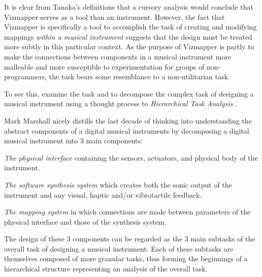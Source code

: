 It is clear from Tanaka's definitions that a cursory analysis would conclude that Vizmapper serves as a tool than an instrument. However, the fact that Vizmapper is specifically a tool to accomplish the task of creating and modifying mappings \emph{within a musical instrument} suggests that the design must be treated more subtly in this particular context. As the purpose of Vizmapper is partly to make the connections between components in a musical instrument more malleable and more susceptible to experimentation for groups of non-programmers, the task bears some resemblance to a non-utilitarian task.

To see this, examine the task and to decompose the complex task of designing a musical instrument using a thought process to \emph{Hierarchical Task Analysis} \cite{annett1967}. 

Mark Marshall nicely distills the last decade of thinking into understanding the abstract components of a digital musical instruments by decomposing a digital musical instrument into 3 main components:

\begin{description}
\item \emph{The physical interface} containing the sensors, actuators, and physical body of the instrument.
\item \emph{The software synthesis system} which creates both the sonic output of the instrument and any visual, haptic and/or vibrotactile feedback.
\item \emph{The mapping system} in which connections are made between parameters of the physical interface and those of the synthesis system.
\end{description}

The design of these 3 components can be regarded as the 3 main subtasks of the overall task of designing a musical instrument. Each of these subtasks are themselves composed of more granular tasks, thus forming the beginnings of a hierarchical structure representing an analysis of the overall task.

